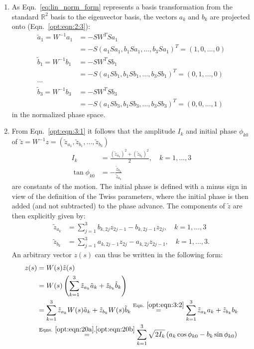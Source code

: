 \begin{enumerate}
\item As Eqn.~\ref{eq:lin_norm_form} represents a basis transformation from the standard $\mathbb{R}^2$ basis to the eigenvector basis, the vectors $a_k$ and $b_k$ are projected onto (Eqn.~\ref{opt:eqn:2:3}):
\begin{align}\label{opt:eqn:3:2}
\tilde a_1=W^{-1}a_1&=-SW^TSa_1\nonumber\\
&=-S(a_1Sa_1,b_1Sa_1,\ldots,b_3Sa_1)^T=(1,0,\ldots,0)\nonumber\\
\tilde b_1=W^{-1}b_1&=-SW^TSb_1\nonumber\\
&=-S(a_1Sb_1,b_1Sb_1,\ldots,b_3Sb_1)^T=(0,1,\ldots,0)\\
\cdots & \nonumber\\
\tilde b_3=W^{-1}b_3&=-SW^TSb_3\nonumber\\
&=-S(a_1Sb_3,b_1Sb_3,\ldots,b_3Sb_3)^T=(0,0,\ldots,1)\nonumber
\end{align}
in the normalized phase space.
\item From Eqn.~\ref{opt:eqn:3:1} it follows that the amplitude $I_k$ and initial phase $\phi_{k0}$ of $\tilde z=W^{-1}z=(\tilde z_{a_1},\tilde z_{b_1},\ldots,\tilde z_{b_3})$
\begin{align}
I_k&=\frac{(\tilde z_{a_k})^2 +(\tilde z_{b_k})^2}{2}, \quad k=1,\ldots,3\label{opt:eqn:20a}\\
\tan\phi_{k0}&=-\frac{\tilde z_{b_k}}{\tilde z_{a_k}} \label{opt:eqn:20b}
\end{align}
are constants of the motion.
The initial phase is defined with a minus sign in view of the definition of the Twiss parameters, where the initial phase is then added (and not subtracted) to the phase advance. The components of $\tilde z$ are then explicitly given by:
\begin{align}
\tilde z_{a_k}&= \sum_{j=1}^3  b_{k,2j} z_{2j-1}- b_{k,2j-1} z_{2j}, \quad k=1,\ldots,3\\
\tilde z_{b_k}&= \sum_{j=1}^3 a_{k,2j-1} z_{2j}- a_{k,2j} z_{2j-1}, \quad k=1,\ldots,3.
\end{align}
An arbitrary vector $z(s)$ can thus be written in the following form:
\begin{align}
 z(s)&=W(s)\tilde z(s)\nonumber\\
 &=W(s)\left(\sum_{k=1}^{3}\tilde z_{a_k}\tilde a_k + \tilde z_{b_k}\tilde b_k\right)\nonumber\\
 &=\sum_{k=1}^{3}\tilde z_{a_k}W(s)\tilde a_k + \tilde z_{b_k}W(s)\tilde b_k\overset{\rm Eqn.~\ref{opt:eqn:3:2}}{=}\sum_{k=1}^{3}\tilde z_{a_k}a_k + \tilde z_{b_k}b_k\nonumber\\
 &\overset{\rm Eqns.~\ref
 	{opt:eqn:20a},\ref{opt:eqn:20b}}=\sum_{k=1}^{3}\sqrt{2I_k}\left(a_k\cos{\phi_{k0}}-b_k\sin{\phi_{k0}}\right)
\end{align}
\end{enumerate}


